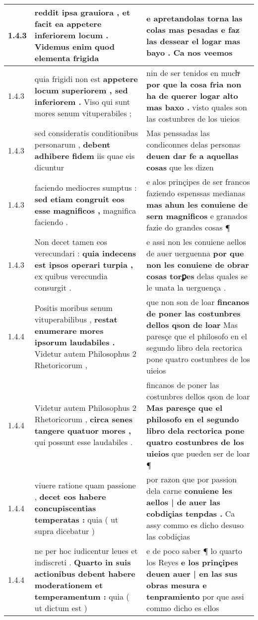 \begin{tabular}{|p{1cm}|p{6.5cm}|p{6.5cm}|}
1.4.3 & reddit ipsa grauiora , \textbf{ et facit ea appetere inferiorem locum . } Videmus enim quod elementa frigida & e apretandolas torna las colas mas pesadas \textbf{ e faz las dessear el logar mas bayo . } Ca nos veemos \\\hline
1.4.3 & quia frigidi non est \textbf{ appetere locum superiorem , sed inferiorem . } Viso qui sunt mores senum vituperabiles ; & nin de ser tenidos en muchͣ \textbf{ por que la cosa fria non ha de querer logar alto mas baxo . } visto quales son las costunbres de los uieios \\\hline
1.4.3 & sed consideratis conditionibus personarum , \textbf{ debent adhibere fidem } iis quae eis dicuntur & Mas penssadas las condiconnes delas personas \textbf{ deuen dar fe a aquellas cosas } que les dizen \\\hline
1.4.3 & faciendo mediocres sumptus : \textbf{ sed etiam congruit eos esse magnificos , } magnifica faciendo . & e alos prinçipes de ser francos faziendo espenssas medianas \textbf{ mas ahun les conuiene de sern magnificos } e granados fazie do grandes cosas ¶ \\\hline
1.4.3 & Non decet tamen eos verecundari : \textbf{ quia indecens est ipsos operari turpia , } ex quibus verecundia consurgit . & e assi non les conuiene aellos de auer uerguenna \textbf{ por que non les conuiene de obrar cosas torꝑes } delas quales se le unata la uerguença . \\\hline
1.4.4 & Positis moribus senum vituperabilibus , \textbf{ restat enumerare mores ipsorum laudabiles . } Videtur autem Philosophus 2 Rhetoricorum , & que non son de loar \textbf{ fincanos de poner las costunbres dellos qson de loar } Mas paresçe que el philosofo en el segundo libro dela rectorica pone quatro costunbres de los uieios \\\hline
1.4.4 & Videtur autem Philosophus 2 Rhetoricorum , \textbf{ circa senes tangere quatuor mores , } qui possunt esse laudabiles . & fincanos de poner las costunbres dellos qson de loar \textbf{ Mas paresçe que el philosofo en el segundo libro dela rectorica pone quatro costunbres de los uieios } que pueden ser de loar ¶ \\\hline
1.4.4 & viuere ratione quam passione , \textbf{ decet eos habere concupiscentias temperatas : } quia ( ut supra dicebatur ) & por razon que por passion dela carne \textbf{ conuiene les aellos | de auer las cobdiçias tenpdas . } Ca assy commo es dicho desuso las cobdiçias \\\hline
1.4.4 & ne per hoc iudicentur leues et indiscreti . \textbf{ Quarto in suis actionibus debent habere moderationem et temperamentum : } quia ( ut dictum est ) & e de poco saber ¶ lo quarto los Reyes \textbf{ e los prinçipes deuen auer | en las sus obras mesura e tenpramiento } por que assi commo dicho es ellos \\\hline

\end{tabular}
